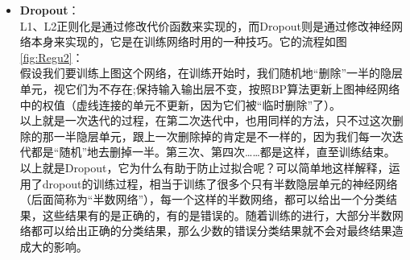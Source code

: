 \documentclass[11pt,fleqn, UTF8]{ctexbook} %
\begin{document}
\begin{itemize}
  如果使用迭代优化的算法，condition number 太大仍然会导致问题：它会拖慢迭代的收敛速度，而规则项从优化的角度来看，实际上是将目标函数变成$\lambda$-strongly convex\footnote{
  A differentiable function $f$ is called \textbf{$\lambda$-strongly convex} with parameter $\lambda > 0$ if the following inequality holds for all points x, y in its domain:
  \begin{equation*}
    ( \nabla f(x) - \nabla f(y) )^T (x-y) \ge \lambda \|x-y\|_2^2
  \end{equation*}
  or, more generally,
  \begin{equation*}
    \langle \nabla f(x) - \nabla f(y),  (x-y) \rangle \ge \lambda \|x-y\|^2
  \end{equation*}
  where $\|\cdot\|$ is any norm.
  }（$\lambda$强凸）的，也即可以在迭代中避免大平原的情况.
  \item \textbf{Dropout}：\\
  L1、L2正则化是通过修改代价函数来实现的，而Dropout则是通过修改神经网络本身来实现的，它是在训练网络时用的一种技巧。它的流程如图\ref{fig:Regu2}：\\
  假设我们要训练上图这个网络，在训练开始时，我们随机地“删除”一半的隐层单元，视它们为不存在;保持输入输出层不变，按照BP算法更新上图神经网络中的权值（虚线连接的单元不更新，因为它们被“临时删除”了）。\\
  以上就是一次迭代的过程，在第二次迭代中，也用同样的方法，只不过这次删除的那一半隐层单元，跟上一次删除掉的肯定是不一样的，因为我们每一次迭代都是“随机”地去删掉一半。第三次、第四次……都是这样，直至训练结束。\\
  以上就是Dropout，它为什么有助于防止过拟合呢？可以简单地这样解释，运用了dropout的训练过程，相当于训练了很多个只有半数隐层单元的神经网络（后面简称为“半数网络”），每一个这样的半数网络，都可以给出一个分类结果，这些结果有的是正确的，有的是错误的。随着训练的进行，大部分半数网络都可以给出正确的分类结果，那么少数的错误分类结果就不会对最终结果造成大的影响。


\end{itemize}
\end{document}

